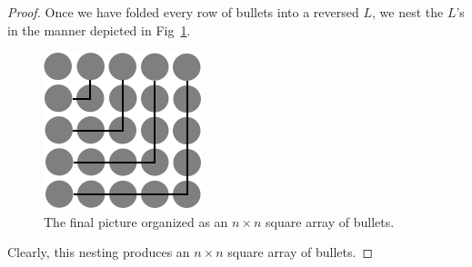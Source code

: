 \begin{proof}
Once we have folded every row of bullets into a reversed $L$, we nest
the $L$'s in the manner depicted in Fig~\ref{fig:sumOdds3}.
\begin{figure}[h]
\begin{center}
       \includegraphics[scale=0.4]{FiguresMaths/SumOddsFinal}
\caption{The final picture organized as an $n \times n$ square
  array of bullets.}
       \label{fig:sumOdds3}
\end{center}
\end{figure}
Clearly, this nesting produces an $n \times n$ square array of
bullets.  
\end{proof}

\medskip

